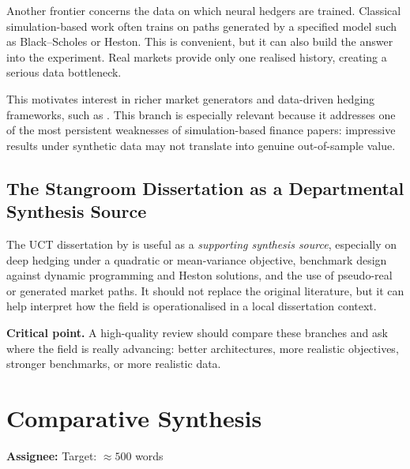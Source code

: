 \documentclass[12pt, a4paper]{article}
\newcommand{\crit}[1]{\noindent\textbf{Critical point.} #1}
\begin{document}
Another frontier concerns the data on which neural hedgers are trained. Classical
simulation-based work often trains on paths generated by a specified model such as
Black--Scholes or Heston. This is convenient, but it can also build the answer into
the experiment. Real markets provide only one realised history, creating a serious
data bottleneck.

This motivates interest in richer market generators and data-driven hedging
frameworks, such as \citet{Cont2025}. This branch is especially relevant because it
addresses one of the most persistent weaknesses of simulation-based finance papers:
impressive results under synthetic data may not translate into genuine out-of-sample
value.

\subsection{The Stangroom Dissertation as a Departmental Synthesis Source}
\label{subsec:stangroom}

The UCT dissertation by \citet{Stangroom2021} is useful as a \emph{supporting
synthesis source}, especially on deep hedging under a quadratic or mean-variance
objective, benchmark design against dynamic programming and Heston solutions, and the
use of pseudo-real or generated market paths. It should not replace the original
literature, but it can help interpret how the field is operationalised in a local
dissertation context.

\crit{A high-quality review should compare these branches and ask where the field is
really advancing: better architectures, more realistic objectives, stronger benchmarks,
or more realistic data.}

\section{Comparative Synthesis}
\label{sec:synthesis}

\begin{assignbox}
\textbf{Assignee:} \underline{\hspace{4cm}} \quad Target: $\approx 500$ words
\end{assignbox}

\end{document}
